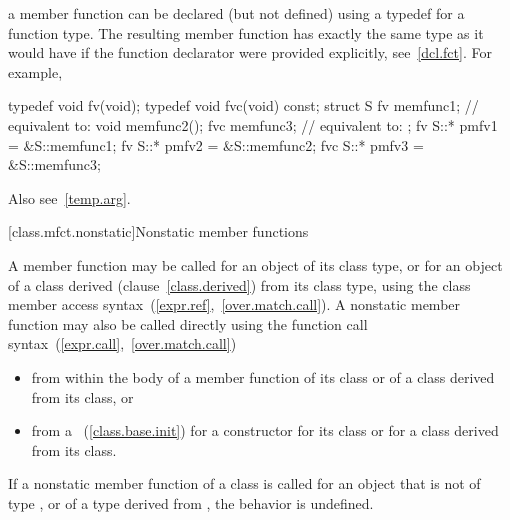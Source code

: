 \pnum
\enternote
a member function can be declared (but not defined) using a typedef for
a function type. The resulting member function has exactly the same type
as it would have if the function declarator were provided explicitly,
see~\ref{dcl.fct}. For example,

\begin{codeblock}
typedef void fv(void);
typedef void fvc(void) const;
struct S {
	fv memfunc1;		// equivalent to: 
	void memfunc2();
	fvc memfunc3;		// equivalent to: 
};
fv  S::* pmfv1 = &S::memfunc1;
fv  S::* pmfv2 = &S::memfunc2;
fvc S::* pmfv3 = &S::memfunc3;
\end{codeblock}

Also see~\ref{temp.arg}.
\exitnote

[class.mfct.nonstatic]{Nonstatic member functions}%

\pnum
A  member function may be called for an object of
its class type, or for an object of a class derived
(clause~\ref{class.derived}) from its class type, using the class member
access syntax~(\ref{expr.ref},~\ref{over.match.call}). A nonstatic
member function may also be called directly using the function call
syntax~(\ref{expr.call},~\ref{over.match.call})

\begin{itemize}
\item from within
the body of a member function of its class or of a class derived from
its class, or
\item from a ~(\ref{class.base.init}) for
a constructor for its class or for a class derived from its class.
\end{itemize}

%
If a nonstatic member function of a class  is called for an
object that is not of type , or of a type derived from
, the behavior is undefined.

